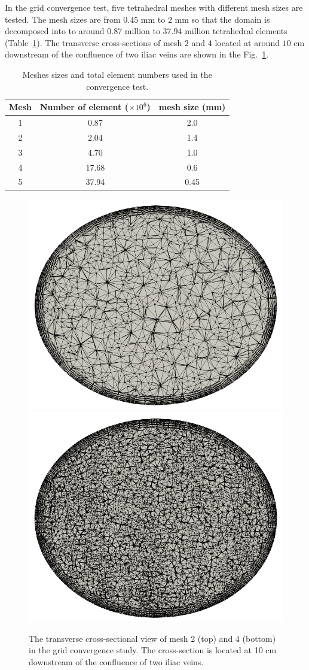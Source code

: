 In the grid convergence test, five tetrahedral meshes with different mesh sizes are tested. The mesh sizes are from $0.45$ mm to $2$ mm so that the domain is decomposed into to around $0.87$ million to $37.94$ million tetrahedral elements (Table~\ref{tab:meshsize}). The transverse cross-sections of mesh $2$ and $4$ located at around $10$ cm downstream of the confluence of two iliac veins are shown in the Fig.~\ref{fig:IVCmesh}.

\begin{table}[h]
\caption {Meshes sizes and total element numbers used in the convergence test.} \label{tab:meshsize}
\centering
\begin{tabular}{|c|c|c|}
\hline
Mesh & Number of element ($\times10^6$)& mesh size (mm) \\ \hline
1    & 0.87              & 2.0              \\ \hline
2    & 2.04              & 1.4            \\ \hline
3    & 4.70              & 1.0               \\ \hline
4    & 17.68             & 0.6            \\ \hline
5    & 37.94             & 0.45            \\ \hline
\end{tabular}
\end{table}

\begin{figure}[h]\centering
    \includegraphics[width=0.5\linewidth]{imgs/vena_cava/mesh2_fixed.png}
    \includegraphics[width=0.5\linewidth]{imgs/vena_cava/mesh4.png}
    \caption{The transverse cross-sectional view of mesh 2 (top) and 4 (bottom) in the grid convergence study. The cross-section is located at 10 cm downstream of the confluence of two iliac veins.}
    \label{fig:IVCmesh}
\end{figure}

